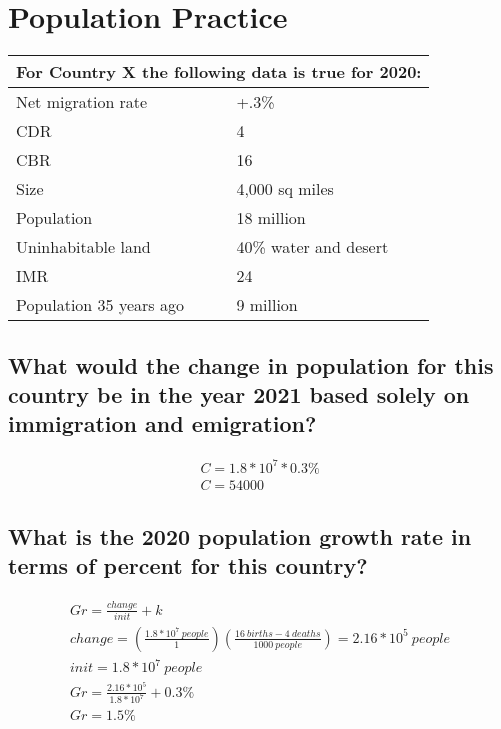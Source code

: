 \documentclass{article}
\begin{document}
\section{Population Practice}

\begin{center}
\begin{tabular}{p{4.5cm}|p{4.5cm}}
    \toprule
    \multicolumn{2}{p{9cm}}{For Country X the following data is true for 2020:} \\
    \midrule
    Net migration rate & +.3\% \\
    CDR & 4 \\
    CBR & 16 \\
    Size & 4,000 sq miles \\
    Population & 18 million \\
    Uninhabitable land & 40\% water and desert \\
    IMR & 24 \\
    Population 35 years ago & 9 million \\
    \bottomrule
\end{tabular}
\end{center}

\subsection{What would the change in population for this country be in the year
2021 based solely on immigration and emigration?}

\begin{gather}
    C = 1.8*10^7 * 0.3\% \\
    C = 54000
\end{gather}

\subsection{What is the 2020 population growth rate in terms of percent for
this country?}

\begin{gather}
    Gr = \frac{change}{init} + k \\
    change = \left(\frac{1.8*10^7 \ people}{1}\right) \left(\frac{16\ births - 4\ deaths}{1000\ people}\right) = 2.16*10^5 \ people \\
    init = 1.8 * 10^7 \ people \\
    Gr = \frac{2.16*10^5}{1.8 * 10^7} + 0.3\% \\
    Gr = 1.5\%
\end{gather}
\end{document}

